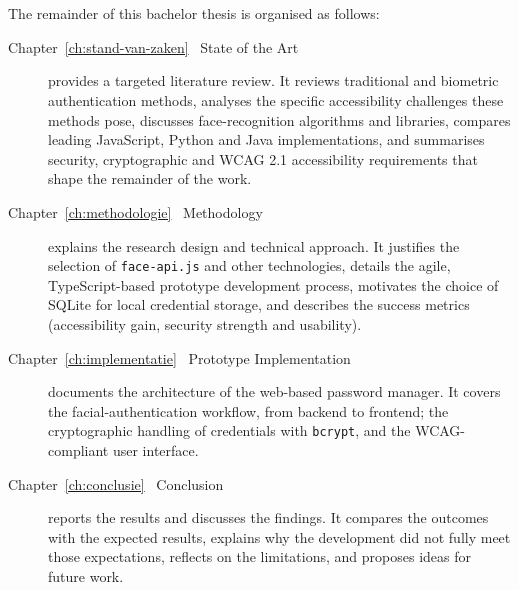 \clearpage
\section{}
\label{sec:opzet-bachelorproef}

The remainder of this bachelor thesis is organised as follows:

\begin{description}
  \item[Chapter~\ref{ch:stand-van-zaken} \textemdash\ State of the Art] provides a targeted literature review.  
        It reviews traditional and biometric authentication methods,  
        analyses the specific accessibility challenges these methods pose,  
        discusses face-recognition algorithms and libraries,  
        compares leading JavaScript, Python and Java implementations, and  
        summarises security, cryptographic and WCAG 2.1 accessibility requirements that shape the remainder of the work.

  \item[Chapter~\ref{ch:methodologie} \textemdash\ Methodology] explains the research design and technical approach.  
        It justifies the selection of \texttt{face-api.js} and other technologies, details the agile, TypeScript-based prototype development process, motivates the choice of SQLite for local credential storage, and describes the success metrics (accessibility gain, security strength and usability).

  \item[Chapter~\ref{ch:implementatie} \textemdash\ Prototype Implementation] documents the architecture of the web-based password manager.  
        It covers the facial-authentication workflow, from backend to frontend; the cryptographic handling of credentials with \texttt{bcrypt}, and the WCAG-compliant user interface.

  \item[Chapter~\ref{ch:conclusie} \textemdash\ Conclusion] reports the results and discusses the findings.  
        It compares the outcomes with the expected results, explains why the development did not fully meet those expectations, reflects on the limitations, and proposes ideas for future work.

\end{description}

